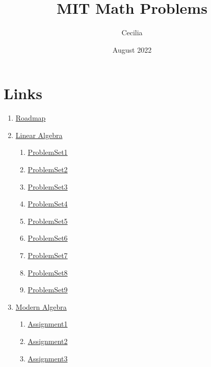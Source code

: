 \documentclass{article}
\title{MIT Math Problems}
\author{Cecilia}
\date{August 2022}
\newcommand{\emptymacro}{}    %
\newcommand{\linearalgebra}{}
\begin{document}
\maketitle

\section*{Links}
    \begin{enumerate}
        \item \href{https://math.mit.edu/academics/undergrad/roadmaps.php}{Roadmap}
        \ifx\linearalgebra\emptymacro
        \item \href{https://ocw.mit.edu/courses/18-700-linearalgebra-fall-2013/}{Linear Algebra}
        \begin{enumerate}
            \item \hyperlink{LinearAlgebra-ProblemSet1.1}{ProblemSet1}
            \item \hyperlink{LinearAlgebra-ProblemSet2.1}{ProblemSet2}
            \item \hyperlink{LinearAlgebra-ProblemSet3.1}{ProblemSet3}
            \item \hyperlink{LinearAlgebra-ProblemSet4.1}{ProblemSet4}
            \item \hyperlink{LinearAlgebra-ProblemSet5.1}{ProblemSet5}
            \item \hyperlink{LinearAlgebra-ProblemSet6.1}{ProblemSet6}
            \item \hyperlink{LinearAlgebra-ProblemSet7.1}{ProblemSet7}
            \item \hyperlink{LinearAlgebra-ProblemSet8.1}{ProblemSet8}
            \item \hyperlink{LinearAlgebra-ProblemSet9.1}{ProblemSet9}
        \end{enumerate}
        \fi
        \item \href{https://math.mit.edu/classes/18.703/index.html}{Modern Algebra}
        \begin{enumerate}
            \item \hyperlink{ModernAlgebra-Assignment01}{Assignment1}
            \item \hyperlink{ModernAlgebra-Assignment02}{Assignment2}
            \item \hyperlink{ModernAlgebra-Assignment03}{Assignment3}
        \end{enumerate}
    \end{enumerate}

\ifx\linearalgebra\emptymacro
%
%








\end{document}
